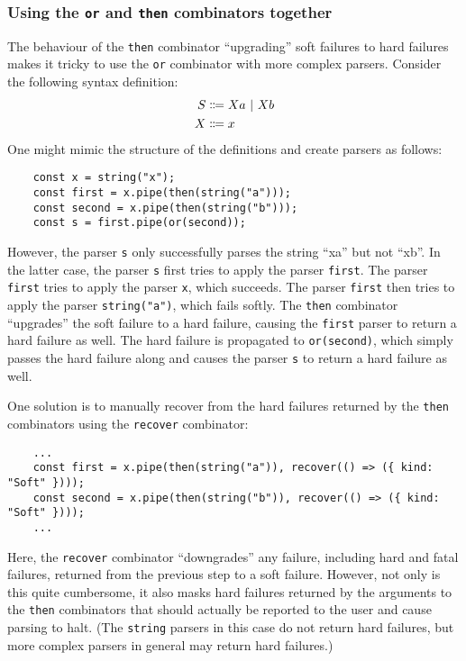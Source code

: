 \subsubsection{Using the \lstinline{or} and \lstinline{then} combinators together}
\label{parsing:thenor}
The behaviour of the \lstinline{then} combinator ``upgrading'' soft failures to hard failures makes it tricky to use the \lstinline{or} combinator with more complex parsers. Consider the following syntax definition:
\begin{align*}
    S &\Coloneqq Xa \ |\  Xb \\
    X &\Coloneqq x
\end{align*}
One might mimic the structure of the definitions and create parsers as follows:
\begin{lstlisting}
    const x = string("x");
    const first = x.pipe(then(string("a")));
    const second = x.pipe(then(string("b")));
    const s = first.pipe(or(second));
\end{lstlisting}
However, the parser \lstinline{s} only successfully parses the string ``xa'' but not ``xb''. In the latter case, the parser \lstinline{s} first tries to apply the parser \lstinline{first}. The parser \lstinline{first} tries to apply the parser \lstinline{x}, which succeeds. The parser \lstinline{first} then tries to apply the parser \lstinline{string("a")}, which fails softly. The \lstinline{then} combinator ``upgrades'' the soft failure to a hard failure, causing the \lstinline{first} parser to return a hard failure as well. The hard failure is propagated to \lstinline{or(second)}, which simply passes the hard failure along and causes the parser \lstinline{s} to return a hard failure as well.

One solution is to manually recover from the hard failures returned by the \lstinline{then} combinators using the \lstinline{recover} combinator:
\begin{lstlisting}
    ...
    const first = x.pipe(then(string("a")), recover(() => ({ kind: "Soft" })));
    const second = x.pipe(then(string("b")), recover(() => ({ kind: "Soft" })));
    ...
\end{lstlisting}
Here, the \lstinline{recover} combinator ``downgrades'' any failure, including hard and fatal failures, returned from the previous step to a soft failure. However, not only is this quite cumbersome, it also masks hard failures returned by the arguments to the \lstinline{then} combinators that should actually be reported to the user and cause parsing to halt. (The \lstinline{string} parsers in this case do not return hard failures, but more complex parsers in general may return hard failures.)

